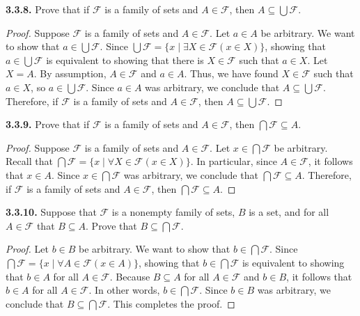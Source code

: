 \documentclass[12pt]{amsart}
\newenvironment{statement}[1]{\smallskip\noindent\color[rgb]{.6627, .3529, .6314} {\bf #1.}}{}
\theoremstyle{definition}
\theoremstyle{remark}
\begin{document}
\begin{statement}{3.3.8}
Prove that if $\mathcal{F}$ is a family of sets and $A \in \mathcal{F}$, then $A \subseteq \bigcup \mathcal{F}$.
\end{statement}

\begin{proof}
Suppose $\mathcal{F}$ is a family of sets and $A \in \mathcal{F}$.
Let $a \in A$ be arbitrary.
We want to show that $a \in \bigcup \mathcal{F}$.
Since $\bigcup \mathcal{F} = \{ x \mid \exists X \in \mathcal{F} (x \in X) \}$, showing that $a \in \bigcup \mathcal{F}$ is equivalent to showing that there is $X \in \mathcal{F}$ such that $a \in X$.
Let $X = A$.
By assumption, $A \in \mathcal{F}$ and $a \in A$.
Thus, we have found $X \in \mathcal{F}$ such that $a \in X$, so $a \in \bigcup \mathcal{F}$.
Since $a \in A$ was arbitrary, we conclude that $A \subseteq \bigcup \mathcal{F}$.
Therefore, if $\mathcal{F}$ is a family of sets and $A \in \mathcal{F}$, then $A \subseteq \bigcup \mathcal{F}$.
\end{proof}


\begin{statement}{3.3.9}
Prove that if $\mathcal{F}$ is a family of sets and $A \in \mathcal{F}$, then $\bigcap \mathcal{F} \subseteq A$.
\end{statement}

\begin{proof}
Suppose $\mathcal{F}$ is a family of sets and $A \in \mathcal{F}$.
Let $x \in \bigcap \mathcal{F}$ be arbitrary.
Recall that $\bigcap \mathcal{F} = \{ x \mid \forall X \in \mathcal{F} (x \in X) \}$.
In particular, since $A \in \mathcal{F}$, it follows that $x \in A$.
Since $x \in \bigcap \mathcal{F}$ was arbitrary, we conclude that $\bigcap \mathcal{F} \subseteq A$.
Therefore, if $\mathcal{F}$ is a family of sets and $A \in \mathcal{F}$, then $\bigcap \mathcal{F} \subseteq A$.
\end{proof}


\begin{statement}{3.3.10}
Suppose that $\mathcal{F}$ is a nonempty family of sets, $B$ is a set, and for all $A \in \mathcal{F}$ that $B \subseteq A$.
Prove that $B \subseteq \bigcap \mathcal{F}$.
\end{statement}

\begin{proof}
Let $b \in B$ be arbitrary.
We want to show that $b \in \bigcap \mathcal{F}$.
Since $\bigcap \mathcal{F} = \{ x \mid \forall A \in \mathcal{F} (x \in A) \}$, showing that $b \in \bigcap \mathcal{F}$ is equivalent to showing that $b \in A$ for all $A \in \mathcal{F}$.
Because $B \subseteq A$ for all $A \in \mathcal{F}$ and $b \in B$, it follows that $b \in A$ for all $A \in \mathcal{F}$.
In other words, $b \in \bigcap \mathcal{F}$.
Since $b \in B$ was arbitrary, we conclude that $B \subseteq \bigcap \mathcal{F}$.
This completes the proof.
\end{proof}
\end{document}
